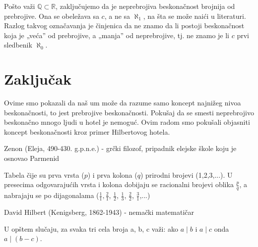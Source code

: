 \documentclass[a4paper]{article}
\begin{document}
Pošto važi $\mathbb{Q}\subset \mathbb{R}$, zaključujemo da je neprebrojiva beskonačnost brojnija od prebrojive. Ona se obeležava sa $c$, a ne sa $\aleph_{1}$, na šta se može naići u literaturi. Razlog takvog označavanja je činjenica da ne znamo da li postoji beskonačnost koja je „veća” od prebrojive, a „manja” od neprebrojive, tj. ne znamo je li $c$ prvi sledbenik $\aleph_{0}$.\\

\section{Zaključak}
\label{poglavlje:Zaključak}
Ovime smo pokazali da naš um može da razume samo koncept najnižeg nivoa beskonačnosti, to jest prebrojive beskonačnosti.
Pokušaj da se smesti neprebrojivo beskonačno mnogo ljudi u hotel je nemoguć. Ovim radom smo pokušali objasniti koncept beskonačnosti kroz primer Hilbertovog hotela.

\renewcommand{\refname}{Dodatak: objašnjenja}
\begin{thebibliography}{9}

 Zenon (Eleja, 490-430. g.p.n.e.) - grčki filozof, pripadnik elejske škole koju je osnovao Parmenid

 Tabela čije su prva vrsta ($p$) i prva kolona ($q$) prirodni brojevi (1,2,3,...). U presecima odgovarajućih vrsta i kolona dobijaju se racionalni brojevi oblika $\frac{p}{q}$, a nabrajaju se po dijagonalama ($\frac{1}{1}, \frac{2}{1}$, $\frac{1}{2}$, $\frac{1}{3}$, $\frac{2}{2}$, $\frac{3}{1}$,...)

 David Hilbert (Kenigsberg, 1862-1943) - nemački matematičar

U opštem slučaju, za svaka tri cela broja a, b, c važi: ako $a \mid b$ i $a \mid c$ onda $a \mid (b - c)$.




\end{thebibliography}
\newpage
\renewcommand{\refname}{Literatura}


\end{document}

